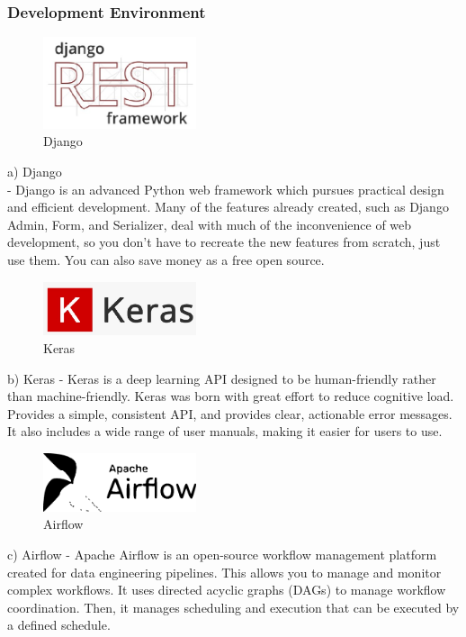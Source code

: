 \documentclass[conference]{IEEEtran}
\begin{document}
\subsubsection{Development Environment}

\begin{figure}[!htbp]
\centering
    \includegraphics[width =4.5cm]{django}
    \hfil
\caption{Django}
\end{figure}
a)	Django\\

-	Django is an advanced Python web framework which pursues practical design and efficient development. Many of the features already created, such as Django Admin, Form, and Serializer, deal with much of the inconvenience of web development, so you don't have to recreate the new features from scratch, just use them. You can also save money as a free open source.

\begin{figure}[!htbp]
\centering
    \includegraphics[width =4.5cm]{keras}
    \hfil
\caption{Keras}
\end{figure}
b)	Keras
-	Keras is a deep learning API designed to be human-friendly rather than machine-friendly. Keras was born with great effort to reduce cognitive load. Provides a simple, consistent API, and provides clear, actionable error messages. It also includes a wide range of user manuals, making it easier for users to use.
\newpage
\begin{figure}[!htbp]
\centering
    \includegraphics[width =4.5cm]{airflow.eps}
    \hfil
\caption{Airflow}
\end{figure}

c)	Airflow
-	Apache Airflow is an open-source workflow management platform created for data engineering pipelines. This allows you to manage and monitor complex workflows. It uses directed acyclic graphs (DAGs) to manage workflow coordination. Then, it manages scheduling and execution that can be executed by a defined schedule.
\end{document}
